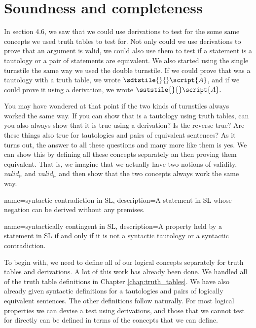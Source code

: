 
\section{Soundness and completeness}
\label{sec:soundness_and_completeness}
In section 4.6, we saw that we could use derivations to test for the some same concepts we used truth tables to test for. Not only could we use derivations to prove that an argument is valid, we could also use them to test if a statement is a tautology or a pair of statements are equivalent. We also started using the single turnstile the same way we used the double turnstile. If we could prove that  was a tautology with a truth table, we wrote $\sdtstile{}{}\script{A}$, and if we could prove it using a derivation, we wrote $\sststile{}{}\script{A}.$ 

You may have wondered at that point if the two kinds of turnstiles always worked the same way. If you can show that  is a tautology using truth tables, can you also always show that it is true using a derivation? Is the reverse true? Are these things also true for tautologies and pairs of equivalent sentences? As it turns out, the answer to all these questions and many more like them is yes. We can show this by defining all these concepts separately an then proving them equivalent. That is, we imagine that we actually have two notions of validity, $valid_{\models}$ and  $valid_{\vdash}$ and then show that the two concepts always work the same way. 

{
name=syntactic contradiction in SL,
description={A statement in SL whose negation can be derived without any premises.}
}


   
{
name=syntactically contingent in SL,
description={A property held by a statement in SL if and only if it is not a syntactic tautology or a syntactic contradiction.}
}




To begin with, we need to define all of our logical concepts separately for truth tables and derivations. A lot of this work has already been done. We handled all of the truth table definitions in Chapter \ref{chap:truth_tables}. We have also already given syntactic definitions for a tautologies and pairs of logically equivalent sentences. The other definitions follow naturally. For most logical properties we can devise a test using derivations, and those that we cannot test for directly can be defined in terms of the concepts that we can define.

